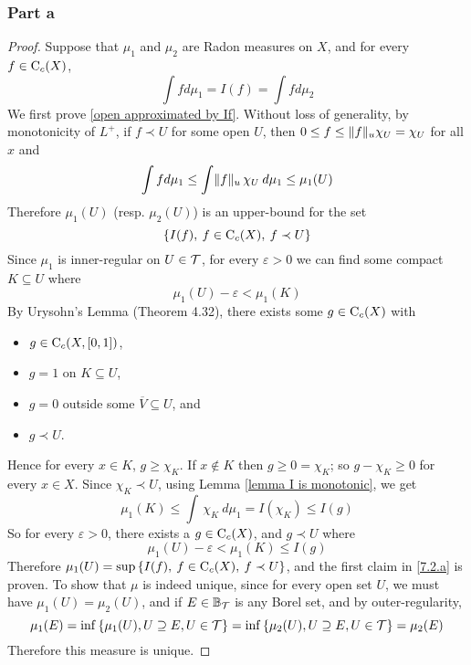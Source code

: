 \documentclass[../../main.tex]{subfiles}
\begin{document}
\subsubsection*{Part a}
\begin{proof}
    Suppose that $\mu_1$ and $\mu_2$ are Radon measures on $X$, and for every $f\in\operatorname{C}_c({X})$,
    \[
    \int fd\mu_1 = I(f) = \int fd\mu_2
    \]
    We first prove \eqref{open approximated by If}. Without loss of generality, by monotonicity of $L^+$, if $f\prec U$ for some open $U$, then $0\leq f\leq \lVert {f} \rVert_u\chi_U=\chi_U$ for all $x$ and
    \[
    \int fd\mu_1\leq \int \lVert {f} \rVert_u\,\chi_U\:d\mu_1 \leq \mu_1(U)
    \]
    Therefore $\mu_1(U)$ (resp. $\mu_2(U)$) is an upper-bound for the set
    \[
    \left\{I(f),\:f\in\operatorname{C}_c({X}),\:f\prec U\right\}
    \]
    Since $\mu_1$ is inner-regular on $U\in\mathcal{T}$, for every $\varepsilon>0$ we can find some compact $K\subseteq U$ where
    \[
    \mu_1(U)-\varepsilon<\mu_1(K)
    \]
    By Urysohn's Lemma (Theorem 4.32), there exists some $g\in\operatorname{C}_c({X})$ with
    \begin{itemize}
        \item $g\in\operatorname{C}_c({X,[0,1]})$,
        \item $g=1$ on $K\subseteq U$,
        \item $g=0$ outside some $\overline{V}\subseteq U$, and
        \item $g\prec U$.
    \end{itemize}
    Hence for every $x\in K$, $g\geq \chi_K$. If $x\notin K$ then $g\geq 0 = \chi_K$; so $g-\chi_K\geq 0$ for every $x\in X$. Since $\chi_K\prec U$, using Lemma \ref{lemma I is monotonic}, we get
    \[
    \mu_1(K)\leq \int\,\chi_K\:d\mu_1=I(\chi_K)\leq I(g)
    \]
    So for every $\varepsilon>0$, there exists a $g\in\operatorname{C}_c({X})$, and $g\prec U$ where
    \[
    \mu_1(U)-\varepsilon<\mu_1(K)\leq I(g)
    \]
    Therefore $\mu_1(U) = \sup\left\{I(f),\:f\in\operatorname{C}_c({X}),\:f\prec U\right\}$, and the first claim in \ref{7.2.a} is proven. To show that $\mu$ is indeed unique, since for every open set $U$, we must have $\mu_1(U)=\mu_2(U)$, and if $E\in\mathbb{B}_{\mathcal{T}}$ is any Borel set, and by outer-regularity,
    \[
    \mu_1(E) = \inf\left\{\mu_1(U), U\supseteq E, U\in\mathcal{T}\right\} = \inf\left\{\mu_2(U), U\supseteq E, U\in\mathcal{T}\right\}=\mu_2(E)
    \]
    Therefore this measure is unique.
\end{proof}
%
%
\end{document}
